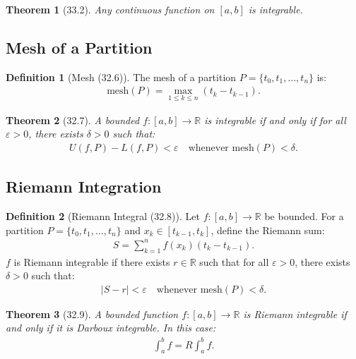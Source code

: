 \documentclass[9pt]{article}
\theoremstyle{definition}
\newtheorem{definition}{Definition}
\theoremstyle{plain}
\newtheorem{theorem}{Theorem}
\begin{document}
\begin{theorem}[33.2]
Any continuous function on $ [a, b] $ is integrable.
\end{theorem}

\subsection*{Mesh of a Partition}
\begin{definition}[Mesh (32.6)]
The mesh of a partition $ P = \{t_0, t_1, \ldots, t_n\} $ is:
\begin{align}
\text{mesh}(P) = \max_{1 \leq k \leq n} (t_k - t_{k-1}).
\end{align}
\end{definition}

\begin{theorem}[32.7]
A bounded $ f : [a, b] \to \mathbb{R} $ is integrable if and only if for all $ \varepsilon > 0 $, there exists $ \delta > 0 $ such that:
\begin{align}
U(f, P) - L(f, P) < \varepsilon \quad \text{whenever mesh}(P) < \delta.
\end{align}
\end{theorem}

\subsection*{Riemann Integration}
\begin{definition}[Riemann Integral (32.8)]
Let $ f : [a, b] \to \mathbb{R} $ be bounded. For a partition $ P = \{t_0, t_1, \ldots, t_n\} $ and $ x_k \in [t_{k-1}, t_k] $, define the Riemann sum:
\begin{align}
S = \sum_{k=1}^n f(x_k)(t_k - t_{k-1}).
\end{align}
$ f $ is Riemann integrable if there exists $ r \in \mathbb{R} $ such that for all $ \varepsilon > 0 $, there exists $ \delta > 0 $ such that:
\begin{align}
|S - r| < \varepsilon \quad \text{whenever mesh}(P) < \delta.
\end{align}
\end{definition}

\begin{theorem}[32.9]
A bounded function $ f : [a, b] \to \mathbb{R} $ is Riemann integrable if and only if it is Darboux integrable. In this case:
\begin{align}
\int_a^b f = R\int_a^b f.
\end{align}
\end{theorem}
\end{document}
